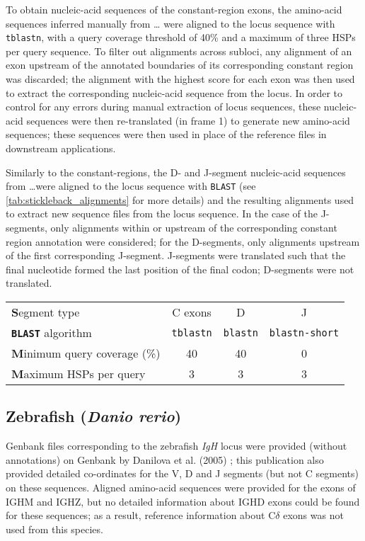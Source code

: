 To obtain nucleic-acid sequences of the constant-region exons, the amino-acid sequences inferred manually from \dots %
were aligned to the locus sequence with \texttt{tblastn}, with a query coverage threshold of 40\% and a maximum of three HSPs per query sequence. To filter out alignments across subloci, any alignment of an exon upstream of the annotated boundaries of its corresponding constant region was discarded; the alignment with the highest score for each exon was then used to extract the corresponding nucleic-acid sequence from the locus. In order to control for any errors during manual extraction of locus sequences, these nucleic-acid sequences were then re-translated (in frame 1) to generate new amino-acid sequences; these sequences were then used in place of the reference files in downstream applications.

Similarly to the constant-regions, the D- and J-segment nucleic-acid sequences from \dots were aligned to the locus sequence with \texttt{BLAST} (see \autoref{tab:stickleback_alignments} for more details) and the resulting alignments used to extract new sequence files from the locus sequence. In the case of the J-segments, only alignments within or upstream of the corresponding constant region annotation were considered; for the D-segments, only alignments upstream of the first corresponding J-segment. J-segments were translated such that the final nucleotide formed the last position of the final codon; D-segments were not translated.

\begin{table}
\begin{tabular}{>{\textbf}lccc}
Segment type & C exons & D & J\\
\texttt{BLAST} algorithm & \texttt{tblastn} & \texttt{blastn} & \texttt{blastn-short}\\
Minimum query coverage (\%) & 40 & 40 & 0\\
Maximum HSPs per query & 3 & 3 & 3\\
\end{tabular}
\label{tab:stickleback_alignments}
\end{table}

\subsection{Zebrafish (\textit{Danio rerio})}

Genbank files corresponding to the zebrafish \textit{IgH} locus were provided (without annotations) on Genbank by Danilova et al. (2005) %
; this publication also provided detailed co-ordinates for the V, D and J segments (but not C segments) on these sequences. Aligned amino-acid sequences were provided for the exons of IGHM and IGHZ, but no detailed information about IGHD exons could be found for these sequences; as a result, reference information about C$\delta$ exons was not used from this species.

